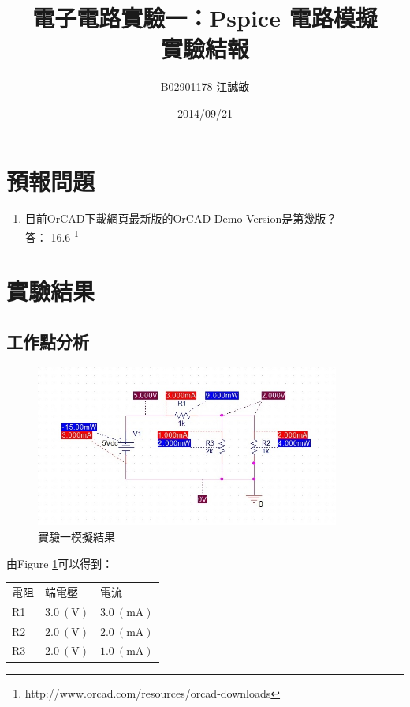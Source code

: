 \documentclass[12pt, a4paper]{article}
\title{ \bf {\Huge 電子電路實驗一：Pspice 電路模擬}\\ 實驗結報}
\author{B02901178 江誠敏}
\date{2014/09/21}
\def\large{\fontsize{14}{21}\selectfont}
\newcommand{\unit}[1]{\:(\text{#1})}
\begin{document}
\maketitle

\section{預報問題}
\begin{enumerate}[itemsep=20pt, topsep=10pt]
	\item {\large 目前OrCAD下載網頁最新版的OrCAD Demo Version是第幾版？} \\[10pt]
		答： 16.6 \footnote{http://www.orcad.com/resources/orcad-downloads}
\end{enumerate}

\section{實驗結果}

\subsection{工作點分析}

\begin{figure}[H]
	\begin{center}
		\includegraphics[width=10cm]{data/q1.jpg}
		\caption{實驗一模擬結果}
		\label{fig:fig1}
	\end{center}
\end{figure}

由Figure \ref{fig:fig1}可以得到：\\
\begin{center}
\begin{tabular}{|p{4cm}|p{4cm}|p{4cm}|}
	\hline
	電阻 & 端電壓 & 電流 \\
	\hhline{|=|=|=|}
	R1 & $3.0 \unit{V}$ & $3.0 \unit{mA}$ \\
	\hline
	R2 & $2.0 \unit{V}$ & $2.0 \unit{mA}$ \\
	\hline
	R3 & $2.0 \unit{V}$ & $1.0 \unit{mA}$ \\
	\hline
\end{tabular}
\end{center}
\end{document}
